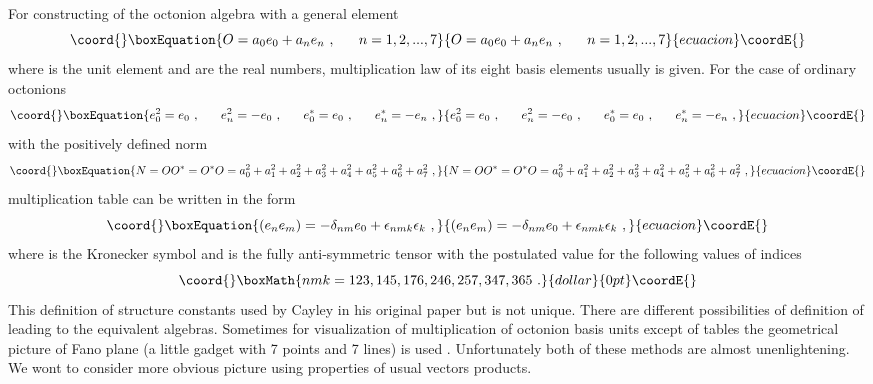 \documentclass[a4paper,12pt]{article}
\begin{document}
For constructing of the octonion algebra with a general element
\begin{equation}\coord{}\boxEquation{ \label{O}
O = a_0 e_0 + a_n e_n ~, ~~~~~n =1,2, ..., 7
}{ O = a_0 e_0 + a_n e_n ~, ~~~~~n =1,2, ..., 7
}{ecuacion}\coordE{}\end{equation}
where \coordHE{} is the unit element and \coordHE{} are the real numbers, multiplication law 
of its eight basis elements \coordHE{} usually is given. For the case of ordinary octonions 
\begin{equation}\coord{}\boxEquation{ \label{en}
e_0^2 = e_0~,~~~~~ e_n^2 = - e_0~, ~~~~~ e_0^* = e_0 ~, ~~~~~ e_n^* = - e_n ~,
}{ e_0^2 = e_0~,~~~~~ e_n^2 = - e_0~, ~~~~~ e_0^* = e_0 ~, ~~~~~ e_n^* = - e_n ~,
}{ecuacion}\coordE{}\end{equation}
with the positively defined norm
\begin{equation}\coord{}\boxEquation{ \label{NO+}
N = OO^* = O^*O = a_0^2 + a_1^2 + a_2^2 + a_3^2 + a_4^2 + a_5^2 + a_6^2 + a_7^2 ~,
}{ N = OO^* = O^*O = a_0^2 + a_1^2 + a_2^2 + a_3^2 + a_4^2 + a_5^2 + a_6^2 + a_7^2 ~,
}{ecuacion}\coordE{}\end{equation}
multiplication table can be written in the form
\begin{equation}\coord{}\boxEquation{ \label{ee}
(e_n e_m) = - \delta_{nm}e_0 + \epsilon_{nmk}\epsilon_k ~,
}{ (e_n e_m) = - \delta_{nm}e_0 + \epsilon_{nmk}\epsilon_k ~,
}{ecuacion}\coordE{}\end{equation}
where \coordHE{} is the Kronecker symbol and \coordHE{} is the fully 
anti-symmetric tensor with the postulated value \coordHE{} for the following 
values of indices 
$$\coord{}\boxMath{
nmk = 123, 145, 176, 246, 257, 347, 365 ~.
}{dollar}{0pt}\coordE{}$$
This definition of structure constants used by Cayley in his original paper but is not 
unique. There are \coordHE{} different possibilities of definition of \coordHE{} leading 
to the equivalent algebras. Sometimes for visualization of multiplication of octonion 
basis units except of tables the geometrical picture of Fano plane (a little gadget with 
7 points and 7 lines) is used \cite{Ba}. Unfortunately both of these methods are almost 
unenlightening. We wont to consider more obvious picture using properties of usual vectors 
products. 
\end{document}
